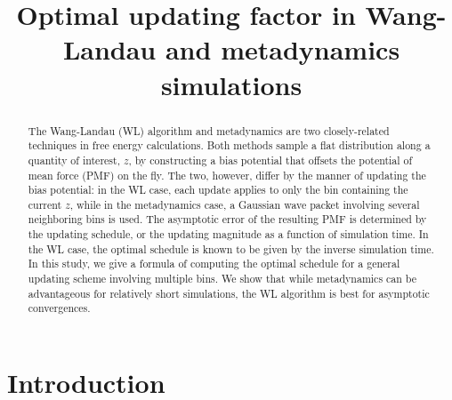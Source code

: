 \documentclass[reprint, floatfix]{revtex4-1}
\begin{document}
\title{Optimal updating factor in Wang-Landau and metadynamics simulations}



\begin{abstract}
  The Wang-Landau (WL) algorithm and metadynamics
  are two closely-related techniques
  in free energy calculations.
  Both methods sample a flat distribution
  along a quantity of interest, $z$,
  by constructing a bias potential that offsets
  the potential of mean force (PMF) on the fly.
  The two, however, differ by
  the manner of updating the bias potential:
  in the WL case,
  each update applies to only
  the bin containing the current $z$,
  while in the metadynamics case,
  a Gaussian wave packet
  involving several neighboring bins
  is used.
  The asymptotic error of the resulting PMF
  is determined by the updating schedule,
  or the updating magnitude
  as a function of simulation time.
  In the WL case,
  the optimal schedule
  is known to be given by
  the inverse simulation time.
  In this study,
  we give a formula of computing the optimal schedule
  for a general updating scheme
  involving multiple bins.
  We show that while metadynamics can be advantageous
  for relatively short simulations,
  the WL algorithm is best for asymptotic convergences.
\end{abstract}

\maketitle



\section{Introduction}
\end{document}
